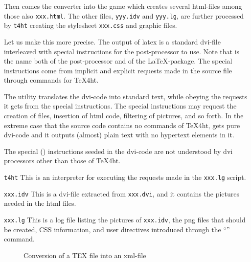 Then comes the converter  into the game 
which creates several html-files among those also \texttt{xxx.html}. 
The other files, \texttt{yyy.idv} and \texttt{yyy.lg}, 
are further processed by \texttt{t4ht} 
creating the stylesheet \texttt{xxx.css} and graphic files. 
\medskip


Let us make this more precise. 
The output of latex is a standard \gls{dvi}-file 
interleaved with special instructions 
for the post-processor  to use. 
Note that  is the name both of the post-processor 
and of the \LaTeX-package. 
The special instructions come from implicit and explicit requests 
made in the source file through commands for TeX4ht. 

The utility  translates the dvi-code into standard text, 
while obeying the requests it gets from the special instructions. 
The special instructions may request the creation of files, 
insertion of html code, filtering of pictures, and so forth. 
In the extreme case that the source code contains no commands of TeX4ht, 
 gets pure dvi-code and it outputs (almost) plain text 
with no hypertext elements in it.

The special () 
instructions seeded in the dvi-code 
are not understood by dvi processors other than those of TeX4ht.

\texttt{t4ht}
This is an interpreter 
for executing the requests made in the \texttt{xxx.lg} script.

\texttt{xxx.idv}
This is a dvi-file extracted from \texttt{xxx.dvi}, 
and it contains the pictures needed in the html files.

\texttt{xxx.lg}
This is a log file listing the pictures of \texttt{xxx.idv}, 
the \gls{png} files that should be created, CSS information, 
and user directives introduced 
through the ``'' command.

\raggedbottom{}


\begin{figure}[!htb]
\centering
{}
\caption{\label{fig:tex2xml}Conversion of a TEX file into an xml-file}
\end{figure}

